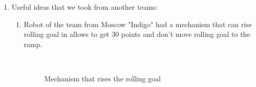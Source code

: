 \begin{enumerate}
	\item Useful ideas that we took from another teams:
	\begin{enumerate}
		\item Robot of the team from Moscow "Indigo" had a mechanism that can rise rolling goal in allows to get 30 points and don't move rolling goal to the ramp.
		\begin{figure}[H]
			\begin{minipage}[h]{0.2\linewidth}
				\center  
			\end{minipage}
			\begin{minipage}[h]{0.6\linewidth}
				\caption{Mechanism that rises the rolling goal}
			\end{minipage}
		\end{figure}
		

\end{enumerate}
\end{enumerate}
